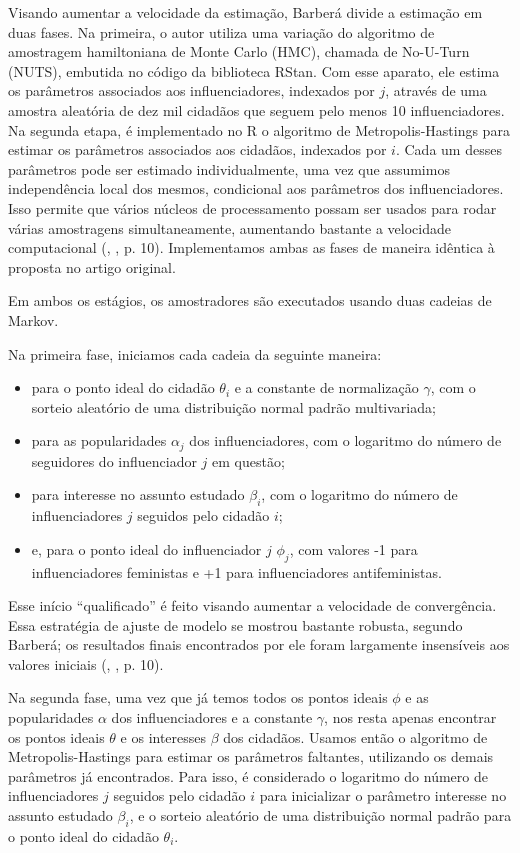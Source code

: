 \documentclass[
	12pt,				%
	openright,			%
	twoside,			%
	a4paper,			%
	english,			%
	brazil				%
	]{abntex2}
\begin{document}
 Visando aumentar a velocidade da estimação, Barberá divide a estimação em duas fases. Na primeira, o autor utiliza uma variação do algoritmo de amostragem hamiltoniana de Monte Carlo (HMC), chamada de No-U-Turn (NUTS), embutida no código da biblioteca RStan. Com esse aparato, ele estima os parâmetros associados aos influenciadores, indexados por $j$, através de uma amostra aleatória de dez mil cidadãos que seguem pelo menos 10 influenciadores. Na segunda etapa, é implementado no R o algoritmo de Metropolis-Hastings para estimar os parâmetros associados aos cidadãos, indexados por $i$. Cada um desses parâmetros pode ser estimado individualmente, uma vez que assumimos independência local dos mesmos, condicional aos parâmetros dos influenciadores. Isso permite que vários núcleos de processamento possam ser usados para rodar várias amostragens simultaneamente, aumentando bastante a velocidade computacional (, \citeyear{barbera2015}, p. 10). Implementamos ambas as fases de maneira idêntica à proposta no artigo original.

 Em ambos os estágios, os amostradores são executados usando duas cadeias de Markov.

 Na primeira fase, iniciamos cada cadeia da seguinte maneira:
 \begin{itemize}
 \item para o ponto ideal do cidadão $\theta_{i}$ e a constante de normalização $\gamma$, com o sorteio aleatório de uma distribuição normal padrão multivariada;
 \item para as popularidades $\alpha_{j}$ dos influenciadores, com o logaritmo do número de seguidores do influenciador $j$ em questão;
 \item para interesse no assunto estudado $\beta_{i}$, com o logaritmo do número de influenciadores $j$ seguidos pelo cidadão $i$;
 \item e, para o ponto ideal do influenciador $j$ $\phi_{j}$, com valores -1 para influenciadores feministas e +1 para influenciadores antifeministas.
 \end{itemize}
 Esse início ``qualificado'' é feito visando aumentar a velocidade de convergência. Essa estratégia de ajuste de modelo se mostrou bastante robusta, segundo Barberá; os resultados finais encontrados por ele foram largamente insensíveis aos valores iniciais (, \citeyear{barbera2015}, p. 10).
 
 Na segunda fase, uma vez que já temos todos os pontos ideais $\phi$ e as popularidades $\alpha$ dos influenciadores e a constante $\gamma$, nos resta apenas encontrar os pontos ideais $\theta$ e os interesses $\beta$ dos cidadãos. Usamos então o algoritmo de Metropolis-Hastings para estimar os parâmetros faltantes, utilizando os demais parâmetros já encontrados. Para isso, é considerado o logaritmo do número de influenciadores $j$ seguidos pelo cidadão $i$ para inicializar o parâmetro interesse no assunto estudado $\beta_{i}$, e o sorteio aleatório de uma distribuição normal padrão para o ponto ideal do cidadão $\theta_{i}$.
 
\end{document}

